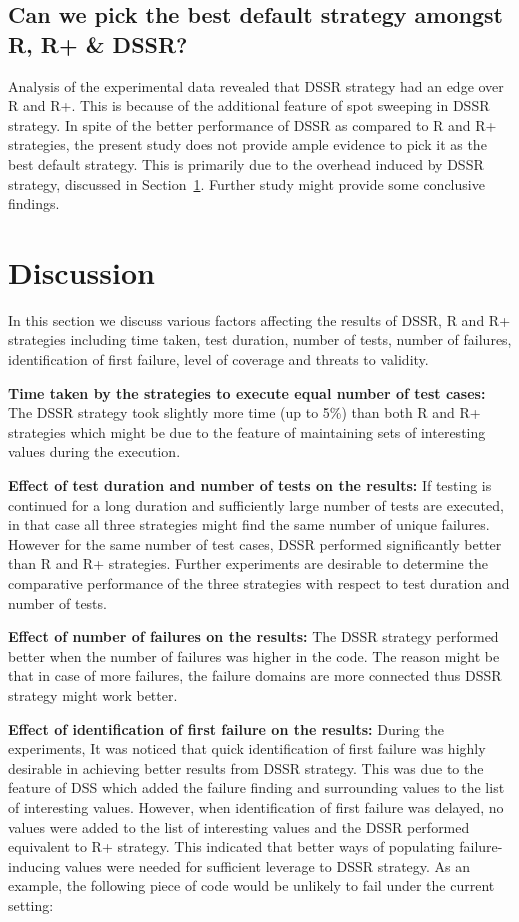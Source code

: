 \subsection{Can we pick the best default strategy amongst R, R+ \& DSSR?}

Analysis of the experimental data revealed that DSSR strategy had an edge over R and R+. This is because of the additional feature of spot sweeping in DSSR strategy. In spite of the better performance of DSSR as compared to R and R+ strategies, the present study does not provide ample evidence to pick it as the best default strategy. This is primarily due to the overhead induced by DSSR strategy, discussed in Section~\ref{sec:discussion3}. Further study might provide some conclusive findings. 





\section{Discussion}\label{sec:discussion3}
In this section we discuss various factors affecting the results of DSSR, R and R+ strategies including time taken, test duration, number of tests, number of failures, identification of first failure, level of coverage and threats to validity.

\textbf{Time taken by the strategies to execute equal number of test cases:}
The DSSR strategy took slightly more time (up to 5\%) than both R and R+ strategies which might be due to the feature of maintaining sets of interesting values during the execution. 

\textbf{Effect of test duration and number of tests on the results:}
If testing is continued for a long duration and sufficiently large number of tests are executed, in that case all three strategies might find the same number of unique failures. However for the same number of test cases, DSSR performed significantly better than R and R+ strategies. Further experiments are desirable to determine the comparative performance of the three strategies with respect to test duration and number of tests.

\textbf{Effect of number of failures on the results:} 
The DSSR strategy performed better when the number of failures was higher in the code. The reason might be that in case of more failures, the failure domains are more connected thus DSSR strategy might work better.

\textbf{Effect of identification of first failure on the results:}
During the experiments, It was noticed that quick identification of first failure was highly desirable in achieving better results from DSSR strategy. This was due to the feature of DSS which added the failure finding and surrounding values to the list of interesting values. However, when identification of first failure was delayed, no values were added to the list of interesting values and the DSSR performed equivalent to R+ strategy. This indicated that better ways of populating failure-inducing values were needed for sufficient leverage to DSSR strategy. As an example, the following piece of code would be unlikely to fail under the current setting:

